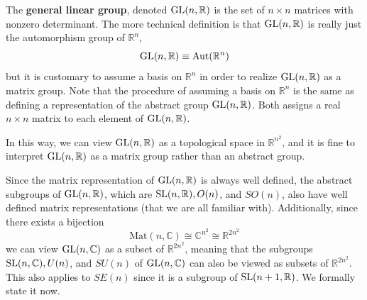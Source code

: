   \begin{definition}
    The \textbf{general linear group}, denoted $\operatorname{GL}(n, \mathbb{R})$ is the set of $n \times n$ matrices with nonzero determinant. The more technical definition is that $\operatorname{GL}(n, \mathbb{R})$ is really just the automorphism group of $\mathbb{R}^n$, 
    \begin{equation}
      \operatorname{GL}(n, \mathbb{R}) \equiv \text{Aut}(\mathbb{R}^n)
    \end{equation}
    but it is customary to assume a basis on $\mathbb{R}^n$ in order to realize $\operatorname{GL}(n, \mathbb{R})$ as a matrix group. Note that the procedure of assuming a basis on $\mathbb{R}^n$ is the same as defining a representation of the abstract group $\operatorname{GL}(n, \mathbb{R})$. Both assigns a real $n \times n$ matrix to each element of $\operatorname{GL}(n, \mathbb{R})$. 
  \end{definition}

  In this way, we can view $\operatorname{GL}(n, \mathbb{R})$ as a topological space in $\mathbb{R}^{n^2}$, and it is fine to interpret $\operatorname{GL}(n, \mathbb{R})$ as a matrix group rather than an abstract group. 

  Since the matrix representation of $\operatorname{GL}(n, \mathbb{R})$ is always well defined, the abstract subgroups of $\operatorname{GL}(n, \mathbb{R})$, which are $\operatorname{SL}(n, \mathbb{R}), O(n)$, and $SO(n)$, also have well defined matrix representations (that we are all familiar with). Additionally, since there exists a bijection
  \begin{equation}
    \text{Mat}(n, \mathbb{C}) \cong \mathbb{C}^{n^2} \cong \mathbb{R}^{2 n^2}
  \end{equation}
  we can view $\operatorname{GL}(n, \mathbb{C})$ as a subset of $\mathbb{R}^{2n^2}$, meaning that the subgroups $\operatorname{SL}(n, \mathbb{C}), U(n)$, and $SU(n)$ of $\operatorname{GL}(n, \mathbb{C})$ can also be viewed as subsets of $\mathbb{R}^{2n^2}$. This also applies to $SE(n)$ since it is a subgroup of $\operatorname{SL}(n+1, \mathbb{R})$. We formally state it now. 

